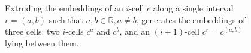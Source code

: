 \begin{figure}[tb]
\centering
{}
\quad
{}
\caption[Extruding the embeddings]{Extruding the embeddings of an $i$-cell $c$ along a single interval $r = (a,b)$ such that $a,b \in \mathbb{R}, a \neq b$, generates the embeddings of three cells: two $i$-cells $c^{a}$ and $c^{b}$, and an $(i+1)$-cell $c^{r} = c^{(a,b)}$ lying between them.}
\label{fig:trianglecomplex}
\end{figure}

